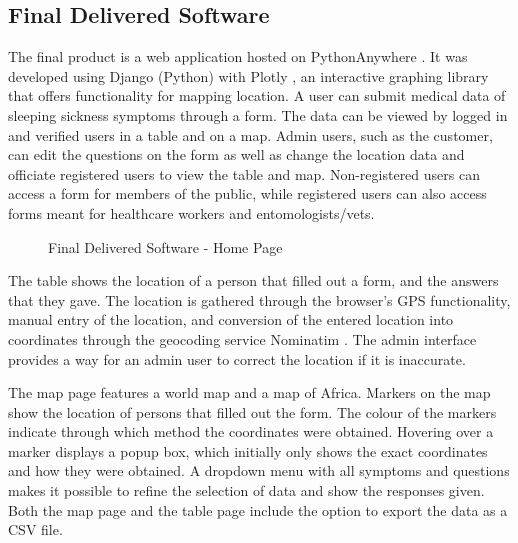 \documentclass{l3proj}
\begin{document}
\subsection{Final Delivered Software}
The final product \cite{TryAdvisor} is a web application hosted on PythonAnywhere \cite{PythonAnywhere}. It was developed using Django \cite{Django} (Python) with Plotly \cite{Plotly}, an interactive graphing library that offers functionality for mapping location. A user can submit medical data of sleeping sickness symptoms through a form. The data can be viewed by logged in and verified users in a table and on a map. Admin users, such as the customer, can edit the questions on the form as well as change the location data and officiate registered users to view the table and map. Non-registered users can access a form for members of the public, while registered users can also access forms meant for healthcare workers and entomologists/vets.
\begin{figure}[H]
  \centering
  \caption{Final Delivered Software - Home Page}
  \label{fig:Final Home Page}
\end{figure}

The table shows the location of a person that filled out a form, and the answers that they gave. The location is gathered through the browser's GPS functionality, manual entry of the location, and conversion of the entered location into coordinates through the geocoding service Nominatim \cite{Nominatim}. The admin interface provides a way for an admin user to correct the location if it is inaccurate.

The map page features a world map and a map of Africa. Markers on the map show the location of persons that filled out the form. The colour of the markers indicate through which method the coordinates were obtained. Hovering over a marker displays a popup box, which initially only shows the exact coordinates and how they were obtained. A dropdown menu with all symptoms and questions makes it possible to refine the selection of data and show the responses given. Both the map page and the table page include the option to export the data as a CSV file.
\end{document}
